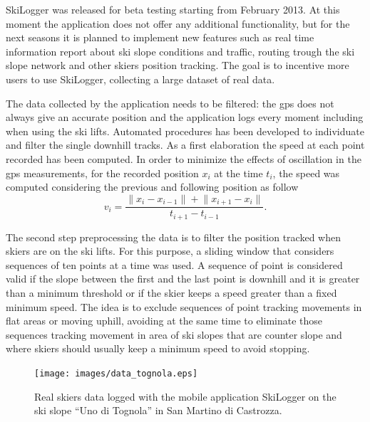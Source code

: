 \documentclass[12pt,a4paper,twoside]{book}
\newcommand{\norm}[1]{\lVert#1\rVert}
\begin{document}
SkiLogger was released for beta testing starting from February 2013. At this moment the application does not offer any additional functionality, but for the next seasons it is planned to implement new features such as real time information report about ski slope conditions and traffic, routing trough the ski slope network and other skiers position tracking. The goal is to incentive more users to use SkiLogger, collecting a large dataset of real data.

The data collected by the application needs to be filtered: the gps does not always give an accurate position and the application logs every moment including when using the ski lifts. Automated procedures has been developed to individuate and filter the single downhill tracks. As a first elaboration the speed at each point recorded has been computed. In order to minimize the effects of oscillation in the gps measurements, for the recorded position $x_i$ at the time $t_i$, the speed was computed considering the previous and following position as follow
\begin{equation}
v_i=\frac{\norm{x_i-x_{i-1}}+\norm{x_{i+1}-x_i}}{t_{i+1}-t_{i-1}}.
\end{equation}

The second step preprocessing the data is to filter the position tracked when skiers are on the ski lifts. For this purpose, a sliding window that considers sequences of ten points at a time was used. A sequence of point is considered valid if the slope between the first and the last point is downhill and it is greater than a minimum threshold or if the skier keeps a speed greater than a fixed minimum speed. The idea is to exclude sequences of point tracking movements in flat areas or moving uphill, avoiding at the same time to eliminate those sequences tracking movement in area of ski slopes that are counter slope and where skiers should usually keep a minimum speed to avoid stopping.

\begin{figure}[!b]
  \begin{center}
    \texttt{[image: images/data\_tognola.eps]}
    \caption{Real skiers data logged with the mobile application SkiLogger on the ski slope ``Uno di Tognola'' in San Martino di Castrozza.}\label{data_tognola}
  \end{center}
\end{figure}
\end{document}
